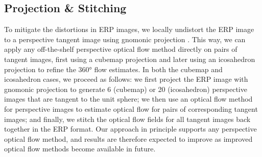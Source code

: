 \subsection{Projection \& Stitching}
\label{sec:approach:projstit}

To mitigate the distortions in ERP images, we locally undistort the ERP image to a perspective tangent image using gnomonic projection \cite{EderSLF2020}.
This way, we can apply any off-the-shelf perspective optical flow method directly on pairs of tangent images, first using a cubemap projection and later using an icosahedron projection to refine the 360° flow estimates.
%
In both the cubemap and icosahedron cases, we proceed as follows:
we first project the ERP image with gnomonic projection to generate 6 (cubemap) or 20 (icosahedron) perspective images that are tangent to the unit sphere;
we then use an optical flow method for perspective images to estimate optical flow for pairs of corresponding tangent images; and
finally, we stitch the optical flow fields for all tangent images back together in the ERP format.
%
Our approach in principle supports any perspective optical flow method, and results are therefore expected to improve as improved optical flow methods become available in future.


